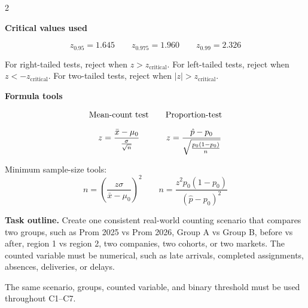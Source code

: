 \documentclass[12pt]{article}
\newcommand{\SubsectionBox}[1]{%
	\noindent\colorbox{gray!30}{%
		\parbox{\linewidth}{\textbf{#1}}%
	}\par\vspace{0.35cm}%
}
\begin{document}
	
	\vspace{0.25cm}
	
	\begin{multicols}{2}
		
	\SubsectionBox{Critical values used}
	\vspace{-1cm}
	\[
	z_{0.95}=1.645
	\qquad
	z_{0.975}=1.960
	\qquad
	z_{0.99}=2.326
	\]
	
	For right-tailed tests, reject when \(z>z_{\text{critical}}\). For left-tailed tests, reject when \(z<-z_{\text{critical}}\). For two-tailed tests, reject when \(|z|>z_{\text{critical}}\).
	
	\vspace{0.25cm}
	
	\SubsectionBox{Formula tools}
	\vspace{-0.65cm}
	\[
	\begin{array}{c@{\qquad}c}
		\text{Mean-count test} & \text{Proportion-test} \\[0.35cm]
		z=\dfrac{\bar x-\mu_0}{\frac{\sigma}{\sqrt{n}}}
		&
		z=\dfrac{\hat p-p_0}{\sqrt{\frac{p_0(1-p_0)}{n}}}
	\end{array}
	\]
	
	Minimum sample-size tools:
	\[
	n=\left(\frac{z\sigma}{\bar x-\mu_0}\right)^2
	\qquad 
	n=\frac{z^2p_0(1-p_0)}{(\hat p-p_0)^2}
	\]
	
	\textbf{Task outline.} Create one consistent real-world counting scenario that compares two groups, such as Prom 2025 vs Prom 2026, Group A vs Group B, before vs after, region 1 vs region 2, two companies, two cohorts, or two markets. The counted variable must be numerical, such as late arrivals, completed assignments, absences, deliveries, or delays.
	
	The same scenario, groups, counted variable, and binary threshold must be used throughout C1--C7.\\
	

\end{multicols}
\end{document}
